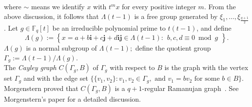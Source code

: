 \documentclass[10pt]{amsart}
\theoremstyle{plain}
\theoremstyle{plain}
\theoremstyle{remark}
\theoremstyle{definition}
\newcommand{\PGL}{\textup{PGL}}
\newcommand{\PSL}{\textup{PSL}}
\begin{document}
where $\sim$ means we identify $x$ with $t^m x$ for every positive integer $m.$
From the above discussion, it follows that $\Lambda(t-1)$ is a free group generated by $\xi_1,\hdots,\xi_{\frac{q+1}{2}}$.  Let $g\in\mathbb{F}_q[t]$ be an irreducible polynomial prime to $t(t-1)$, and define 
\[\Lambda(g):=\left\{x=a+b\mathbf{i}+c\mathbf{j}+d\mathbf{ij}\in\Lambda(t-1):\begin{array}{c}b,c,d\equiv 0\bmod{g}\end{array}\right\}.\]
$\Lambda(g)$ is a normal subgroup of $\Lambda(t-1);$  define the quotient group $\Gamma_g:=\Lambda(t-1)/\Lambda(g).$ 
\\


The \textit{Cayley graph}  $C(\Gamma_g,B)$ of $\Gamma_g$ with respect to $B$  is the graph with the vertex set $\Gamma_g$ and with the edge set $\{\{v_1,v_2\} : v_1,v_2\in \Gamma_g, \text{ and } v_1=bv_2 \text{ for some } b\in B \}.$ Morgenstern proved that  $C(\Gamma_g,B)$ is  a $q+1$-regular Ramanujan graph~\cite[Theorem 4.11]{Morgenstern}.  See Morgenstern's paper \cite{Morgenstern} for a detailed discussion.\\
\end{document}
